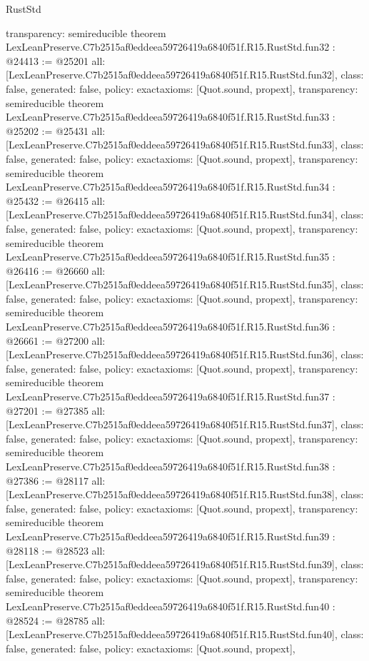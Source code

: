 \begin{lexlean}{RustStd}
\begin{coremodule}
{  transparency: semireducible
}
theorem LexLeanPreserve.C7b2515af0eddeea59726419a6840f51f.R15.RustStd.fun32 : @24413 := @25201 {
  all: [LexLeanPreserve.C7b2515af0eddeea59726419a6840f51f.R15.RustStd.fun32],
  class: false,
  generated: false,
  policy: exact{axioms: [Quot.sound, propext]},
  transparency: semireducible
}
theorem LexLeanPreserve.C7b2515af0eddeea59726419a6840f51f.R15.RustStd.fun33 : @25202 := @25431 {
  all: [LexLeanPreserve.C7b2515af0eddeea59726419a6840f51f.R15.RustStd.fun33],
  class: false,
  generated: false,
  policy: exact{axioms: [Quot.sound, propext]},
  transparency: semireducible
}
theorem LexLeanPreserve.C7b2515af0eddeea59726419a6840f51f.R15.RustStd.fun34 : @25432 := @26415 {
  all: [LexLeanPreserve.C7b2515af0eddeea59726419a6840f51f.R15.RustStd.fun34],
  class: false,
  generated: false,
  policy: exact{axioms: [Quot.sound, propext]},
  transparency: semireducible
}
theorem LexLeanPreserve.C7b2515af0eddeea59726419a6840f51f.R15.RustStd.fun35 : @26416 := @26660 {
  all: [LexLeanPreserve.C7b2515af0eddeea59726419a6840f51f.R15.RustStd.fun35],
  class: false,
  generated: false,
  policy: exact{axioms: [Quot.sound, propext]},
  transparency: semireducible
}
theorem LexLeanPreserve.C7b2515af0eddeea59726419a6840f51f.R15.RustStd.fun36 : @26661 := @27200 {
  all: [LexLeanPreserve.C7b2515af0eddeea59726419a6840f51f.R15.RustStd.fun36],
  class: false,
  generated: false,
  policy: exact{axioms: [Quot.sound, propext]},
  transparency: semireducible
}
theorem LexLeanPreserve.C7b2515af0eddeea59726419a6840f51f.R15.RustStd.fun37 : @27201 := @27385 {
  all: [LexLeanPreserve.C7b2515af0eddeea59726419a6840f51f.R15.RustStd.fun37],
  class: false,
  generated: false,
  policy: exact{axioms: [Quot.sound, propext]},
  transparency: semireducible
}
theorem LexLeanPreserve.C7b2515af0eddeea59726419a6840f51f.R15.RustStd.fun38 : @27386 := @28117 {
  all: [LexLeanPreserve.C7b2515af0eddeea59726419a6840f51f.R15.RustStd.fun38],
  class: false,
  generated: false,
  policy: exact{axioms: [Quot.sound, propext]},
  transparency: semireducible
}
theorem LexLeanPreserve.C7b2515af0eddeea59726419a6840f51f.R15.RustStd.fun39 : @28118 := @28523 {
  all: [LexLeanPreserve.C7b2515af0eddeea59726419a6840f51f.R15.RustStd.fun39],
  class: false,
  generated: false,
  policy: exact{axioms: [Quot.sound, propext]},
  transparency: semireducible
}
theorem LexLeanPreserve.C7b2515af0eddeea59726419a6840f51f.R15.RustStd.fun40 : @28524 := @28785 {
  all: [LexLeanPreserve.C7b2515af0eddeea59726419a6840f51f.R15.RustStd.fun40],
  class: false,
  generated: false,
  policy: exact{axioms: [Quot.sound, propext]},
}
\end{coremodule}
\end{lexlean}
